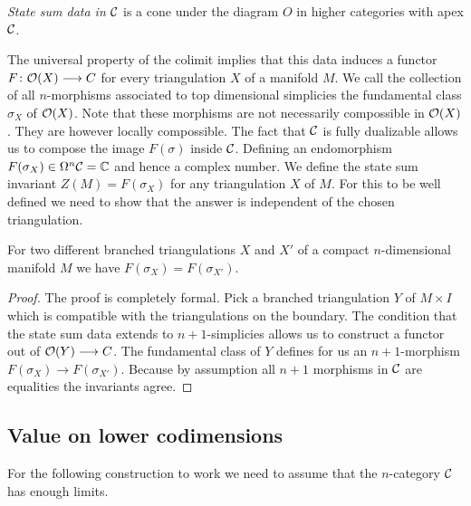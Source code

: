 \begin{definition}
	\emph{State sum data in $\mathcal{C}$} is a cone under the diagram $O$ in higher categories with apex $\mathcal{C}$.
\end{definition}

The universal property of the colimit implies that this data induces a functor $F \colon \mathcal{O}(X) \longrightarrow C$ for every triangulation $X$ of a manifold $M$.
We call the collection of all $n$-morphisms associated to top dimensional simplicies the fundamental class $\sigma_X$ of $\mathcal{O}(X)$.
Note that these morphisms are not necessarily compossible in $\mathcal{O}(X)$.
They are however locally compossible.
The fact that $\mathcal{C}$ is fully dualizable
allows us to compose the image $F(\sigma)$ inside $\mathcal{C}$.
Defining an endomorphism
$F(\sigma_X)\in \Omega^n\mathcal{C}=\mathbb{C} $ and hence a complex number.
We define the state sum invariant $Z(M)=F(\sigma_X)$ for any triangulation $X$ of $M$.
For this to be well defined we need to show that the answer is independent of the chosen triangulation.

\begin{theorem}
	For two different branched triangulations $X$ and $X'$ of a compact $n$-dimensional manifold $M$ we have $F(\sigma_X)=F(\sigma_{X'})$.
\end{theorem}

\begin{proof}
	The proof is completely formal.
	Pick a branched triangulation $Y$ of $M\times I$ which is compatible with the triangulations on the boundary.
	The condition that the state sum data extends to $n+1$-simplicies allows us to construct a functor out of $\mathcal{O}(Y)\longrightarrow C $.
	The fundamental class of $Y$ defines for us an $n+1$-morphism $F(\sigma_X)\longrightarrow F(\sigma_{X'})$.
	Because by assumption all $n+1$ morphisms in $\mathcal{C}$ are equalities the invariants agree.
\end{proof}

\begin{remark}
\end{remark}

\subsection{Value on lower codimensions}

For the following construction to work we need to assume that the $n$-category $\mathcal{C}$ has enough limits.

